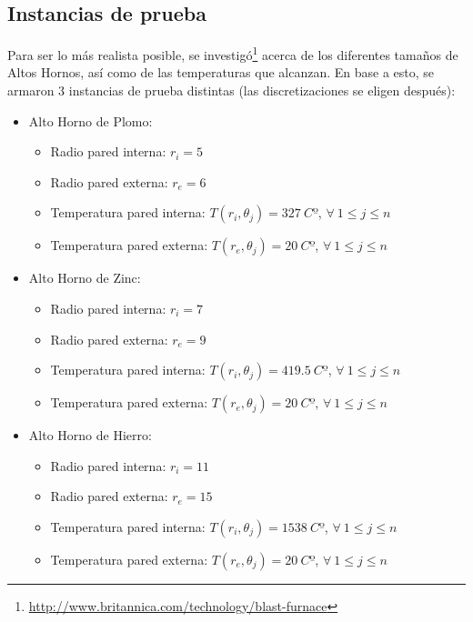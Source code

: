 \newcommand{\imagenB}[2]{%
\texttt{[image: \#2]}
\endgroup}

\def\imagen{\begingroup
\catcode`\_=12
\imagenB}
\subsection{Instancias de prueba}

Para ser lo más realista posible, se investigó\footnote{\url{http://www.britannica.com/technology/blast-furnace}} acerca de los diferentes tamaños de Altos Hornos, así como de las temperaturas que alcanzan.
En base a esto, se armaron 3 instancias de prueba distintas (las discretizaciones se eligen después):
\begin{itemize}
    \item Alto Horno de Plomo:
        \begin{itemize}
            \item Radio pared interna: $r_i = 5$
            \item Radio pared externa: $r_e = 6$
            \item Temperatura pared interna: $T(r_i, \theta_j) = 327\ Cº$, $\forall\ 1 \leq j \leq n$
            \item Temperatura pared externa: $T(r_e, \theta_j) = 20\ Cº$, $\forall\ 1 \leq j \leq n$
        \end{itemize}
    \item Alto Horno de Zinc:
        \begin{itemize}
            \item Radio pared interna: $r_i = 7$
            \item Radio pared externa: $r_e = 9$
            \item Temperatura pared interna: $T(r_i, \theta_j) = 419.5\ Cº$, $\forall\ 1 \leq j \leq n$
            \item Temperatura pared externa: $T(r_e, \theta_j) = 20\ Cº$, $\forall\ 1 \leq j \leq n$
        \end{itemize}
    \item Alto Horno de Hierro:
        \begin{itemize}
            \item Radio pared interna: $r_i = 11$
            \item Radio pared externa: $r_e = 15$
            \item Temperatura pared interna: $T(r_i, \theta_j) = 1538\ Cº$, $\forall\ 1 \leq j \leq n$
            \item Temperatura pared externa: $T(r_e, \theta_j) = 20\ Cº$, $\forall\ 1 \leq j \leq n$
        \end{itemize}
\end{itemize}


